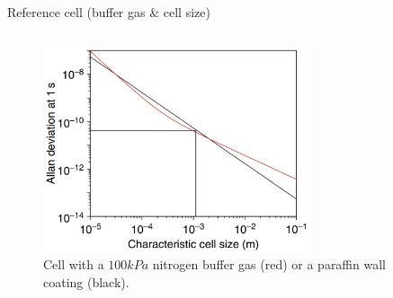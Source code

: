 \begin{frame}{Reference cell (buffer gas \& cell size)}
\begin{columns}[c, onlytextwidth]
\begin{column}{0.5\textwidth}
            \begin{figure}
                \centering
                \includegraphics[width=0.7\textwidth]{img/extra-cell-size.png}
                \caption{Cell with a $100 kPa$ nitrogen buffer gas (red) or a paraffin wall coating (black).}
            \end{figure}

        \end{column}

    \end{columns}


\end{frame}



